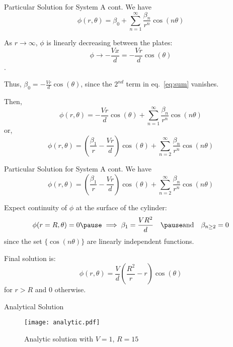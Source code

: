 \documentclass{beamer}
\newcommand{\be}{\begin{equation}}
\newcommand{\ee}{\end{equation}}
\begin{document}
\begin{frame}{Particular Solution for System A cont.}
We have
%
\be
\label{eq:sum}
\phi(r, \theta) = \beta_0 + \sum_{n=1}^{\infty} \frac{\beta_n}{r^n} \cos(n\theta)
\ee

\pause
As $r \rightarrow \infty$, $\phi$ is linearly decreasing between the plates:
%
\be
\phi \rightarrow -\frac{Vx}{d}=-\frac{Vr}{d}\cos(\theta)
\ee.

\pause
Thus, $\beta_0=-\frac{Vr}{d}\cos(\theta)$, since the $2^{nd}$ term in eq.~\ref{eq:sum} 
vanishes.

\pause
Then,
%
\be
\phi(r, \theta) = -\frac{Vr}{d}\cos(\theta) + \sum_{n=1}^{\infty} \frac{\beta_n}{r^n} \cos(n\theta)
\ee
%
\pause
or,
%
\be
\phi(r, \theta) = (\frac{\beta_1}{r}-\frac{Vr}{d})\cos(\theta) + \sum_{n=2}^{\infty} \frac{\beta_n}{r^n} \cos(n\theta)
\ee

\end{frame}

\begin{frame}{Particular Solution for System A cont.}
We have
%
\be
\phi(r, \theta) = (\frac{\beta_1}{r}-\frac{Vr}{d})\cos(\theta) + \sum_{n=2}^{\infty} \frac{\beta_n}{r^n} \cos(n\theta)
\ee

\pause
Expect continuity of $\phi$ at the surface of the cylinder:
\pause
%
\be
\phi(r=R,\theta) = 0 \pause \implies \beta_1=\frac{VR^2}{d} \quad
\pause
\text{and} \quad \beta_{n \geq 2} = 0
\ee
%
since the set $\{\cos(n \theta)\}$ are linearly independent functions.

\pause
Final solution is:
%
\be
\phi(r, \theta) = \frac{V}{d}(\frac{R^2}{r}-r)\cos(\theta)
\ee
for $r>R$ and $0$ otherwise.

\end{frame}

\begin{frame}{Analytical Solution}

\begin{figure}[h!]
\begin{center}
\texttt{[image: analytic.pdf]}
\caption{Analytic solution with $V=1$, $R=15$}
\end{center}
\end{figure}

\end{frame}
\end{document}
